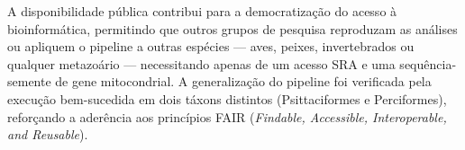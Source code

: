 A disponibilidade pública contribui para a democratização do acesso à bioinformática, permitindo que outros grupos de pesquisa reproduzam as análises ou apliquem o pipeline a outras espécies --- aves, peixes, invertebrados ou qualquer metazoário --- necessitando apenas de um acesso SRA e uma sequência-semente de gene mitocondrial. A generalização do pipeline foi verificada pela execução bem-sucedida em dois táxons distintos (Psittaciformes e Perciformes), reforçando a aderência aos princípios FAIR (\textit{Findable, Accessible, Interoperable, and Reusable}).
